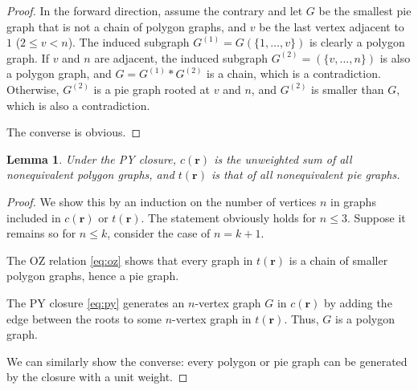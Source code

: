 \documentclass[aip,jcp,reprint,superscriptaddress]{revtex4-1}
\newtheorem{lemm}[thrm]{Lemma}
\newcommand{\vct}[1]{\mathbf{#1}}
\providecommand{\vr}{} %
\renewcommand{\vr}{\vct{r}}
\begin{document}
\begin{proof}
In the forward direction, assume the contrary and
%
let $G$ be the smallest pie graph
  that is not a chain of polygon graphs,
%
and $v$ be the last vertex adjacent to $1$ ($2 \le v < n$).
%
The induced subgraph $G^{(1)} = G(\{1, \dots, v\})$
  is clearly a polygon graph.
%
If $v$ and $n$ are adjacent,
  the induced subgraph $G^{(2)} = (\{v, \dots, n\})$
  is also a polygon graph,
  and $G = G^{(1)} * G^{(2)}$ is a chain,
  which is a contradiction.
%
Otherwise, $G^{(2)}$ is a pie graph
  rooted at $v$ and $n$,
  and $G^{(2)}$ is smaller than $G$,
  which is also a contradiction.

The converse is obvious.
\end{proof}



\begin{lemm}
Under the PY closure,
  $c(\vr)$ is the unweighted sum of
  all nonequivalent polygon graphs,
  and $t(\vr)$ is that of all nonequivalent pie graphs.
\label{thm:pycrsum}
\end{lemm}

\begin{proof}
We show this by an induction on the number of vertices $n$ in
  graphs included in $c(\vr)$ or $t(\vr)$.
%
The statement obviously holds for $n \le 3$.
%
Suppose it remains so for $n \le k$,
consider the case of $n = k + 1$.

The OZ relation \eqref{eq:oz}
  shows that every graph in $t(\vr)$
  is a chain of smaller polygon graphs,
  hence a pie graph. %

The PY closure \eqref{eq:py} generates
  an $n$-vertex graph $G$ in $c(\vr)$
  by adding the edge between the roots
  to some $n$-vertex graph in $t(\vr)$.
%
Thus, $G$ is a polygon graph.

We can similarly show the converse:
  every polygon or pie graph
  can be generated by the closure
  with a unit weight.
\end{proof}
\end{document}
